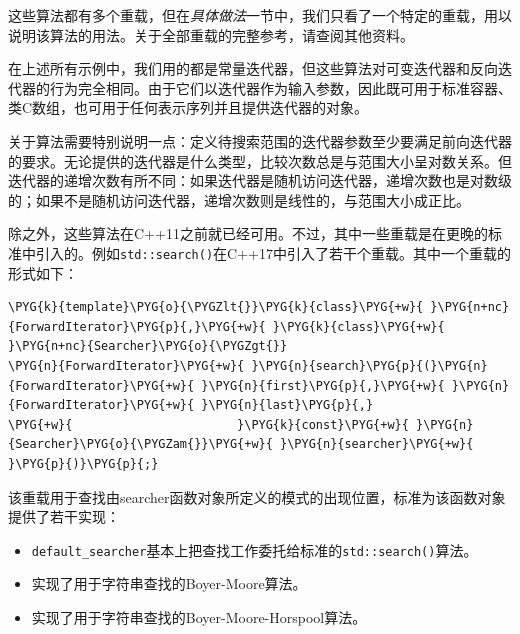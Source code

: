 
这些算法都有多个重载，但在\textit{具体做法}一节中，我们只看了一个特定的重载，用以说明该算法的用法。关于全部重载的完整参考，请查阅其他资料。



在上述所有示例中，我们用的都是常量迭代器，但这些算法对可变迭代器和反向迭代器的行为完全相同。由于它们以迭代器作为输入参数，因此既可用于标准容器、类C数组，也可用于任何表示序列并且提供迭代器的对象。



关于算法需要特别说明一点：定义待搜索范围的迭代器参数至少要满足前向迭代器的要求。无论提供的迭代器是什么类型，比较次数总是与范围大小呈对数关系。但迭代器的递增次数有所不同：如果迭代器是随机访问迭代器，递增次数也是对数级的；如果不是随机访问迭代器，递增次数则是线性的，与范围大小成正比。



除之外，这些算法在C++11之前就已经可用。不过，其中一些重载是在更晚的标准中引入的。例如\texttt{std::\allowbreak{}search()}在C++17中引入了若干个重载。其中一个重载的形式如下：



\begin{codeblockbg}
\begin{Verbatim}[commandchars=\\\{\},breaklines=true,breakanywhere=true,fontsize=\codefont,xleftmargin=17bp]
\PYG{k}{template}\PYG{o}{\PYGZlt{}}\PYG{k}{class}\PYG{+w}{ }\PYG{n+nc}{ForwardIterator}\PYG{p}{,}\PYG{+w}{ }\PYG{k}{class}\PYG{+w}{ }\PYG{n+nc}{Searcher}\PYG{o}{\PYGZgt{}}
\PYG{n}{ForwardIterator}\PYG{+w}{ }\PYG{n}{search}\PYG{p}{(}\PYG{n}{ForwardIterator}\PYG{+w}{ }\PYG{n}{first}\PYG{p}{,}\PYG{+w}{ }\PYG{n}{ForwardIterator}\PYG{+w}{ }\PYG{n}{last}\PYG{p}{,}
\PYG{+w}{                       }\PYG{k}{const}\PYG{+w}{ }\PYG{n}{Searcher}\PYG{o}{\PYGZam{}}\PYG{+w}{ }\PYG{n}{searcher}\PYG{+w}{ }\PYG{p}{)}\PYG{p}{;}
\end{Verbatim}
\end{codeblockbg}



该重载用于查找由searcher函数对象所定义的模式的出现位置，标准为该函数对象提供了若干实现：



\begin{itemize}
\item \texttt{default\_\allowbreak{}searcher}基本上把查找工作委托给标准的\texttt{std::\allowbreak{}search()}算法。



\item {}实现了用于字符串查找的Boyer-Moore算法。



\item {}实现了用于字符串查找的Boyer-Moore-Horspool算法。

\end{itemize}


